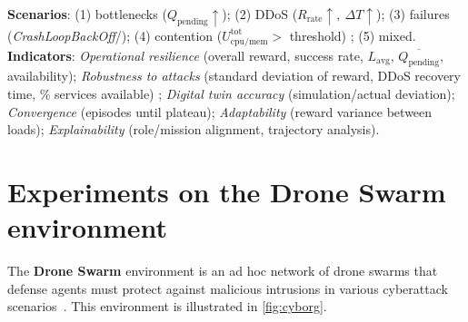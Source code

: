 \textbf{Scenarios}: (1) bottlenecks (\(Q_{\text{pending}}\uparrow\)); (2) DDoS (\(R_{\text{rate}}\uparrow,\ \Delta T\uparrow\)); (3) failures (\textit{CrashLoopBackOff}/); (4) contention (\(U_{\text{cpu/mem}}^{\text{tot}}>\) threshold) ; (5) mixed. \textbf{Indicators}: \emph{Operational resilience} (overall reward, success rate, \(L_{\text{avg}}\), \(\overline{Q_{\text{pending}}}\), availability); \emph{Robustness to attacks} (standard deviation of reward, DDoS recovery time, \% services available) ; \emph{Digital twin accuracy} (simulation/actual deviation); \emph{Convergence} (episodes until plateau); \emph{Adaptability} (reward variance between loads); \emph{Explainability} (role/mission alignment, trajectory analysis).


\section{Experiments on the Drone Swarm environment}

The \textbf{Drone Swarm} environment is an ad hoc network of drone swarms that defense agents must protect against malicious intrusions in various cyberattack scenarios~\cite{Standen2021}. This environment is illustrated in \autoref{fig:cyborg}.


